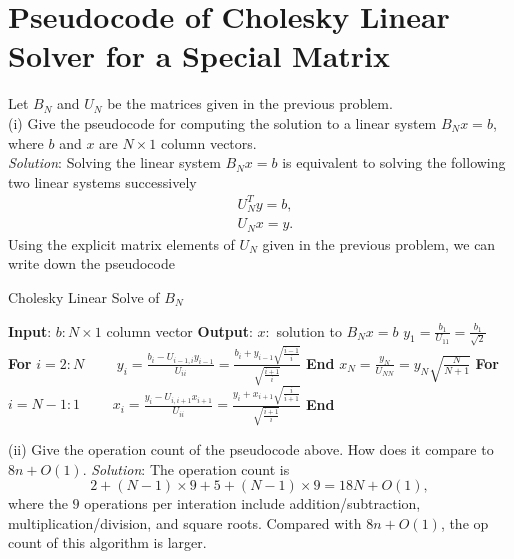 \documentclass[paper=a4, fontsize=11pt]{scrartcl} %
\numberwithin{equation}{section} %
\numberwithin{figure}{section} %
\numberwithin{table}{section} %
\begin{document}
\newpage

\section{Pseudocode of Cholesky Linear Solver for a Special Matrix}
Let $B_N$ and $U_N$ be the matrices given in the previous problem.\\
(i) Give the pseudocode for computing the solution to a linear system $B_N x =b$, where $b$ and $x$ are $N\times 1$ column vectors.\\
\textit{Solution}: Solving the linear system $B_N x =b$ is equivalent to solving the following two linear systems successively
\begin{align}
\nonumber & U_N^T y = b,\\
\nonumber & U_N x = y.
\end{align}
Using the explicit matrix elements of $U_N$ given in the previous problem, we can write down the pseudocode
\begin{algorithm}
\caption{Cholesky Linear Solve of $B_N$}\label{clsb}
\begin{algorithmic}
\STATE \textbf{Input}: $b: N\times 1$ column vector
\STATE \textbf{Output}: $x: $ solution to $B_N x =b$
\STATE $y_1 = \frac{b_1}{U_{11}}= \frac{b_1}{\sqrt{2}}$
\STATE \textbf{For} $i=2:N$
    \STATE $\quad\quad y_i = \frac{b_i - U_{i-1,i}y_{i-1}}{U_{ii}}= \frac{b_i + y_{i-1}\sqrt{\frac{i-1}{i}}}{\sqrt{\frac{i+1}{i}}}$
\STATE \textbf{End}
\STATE $x_N =\frac{y_N}{U_{NN}} = y_N\sqrt{\frac{N}{N+1}}$
\STATE \textbf{For} $i=N-1:1$
    \STATE $\quad\quad x_i = \frac{y_i - U_{i,i+1}x_{i+1}}{U_{ii}} = \frac{y_i + x_{i+1}\sqrt{\frac{i}{i+1}}}{\sqrt{\frac{i+1}{i}}}$
\STATE \textbf{End}
\end{algorithmic}
\end{algorithm}

(ii) Give the operation count of the pseudocode above. How does it compare to $8n+O(1)$.
\textit{Solution}: The operation count is
$$
2 + (N-1)\times 9 + 5 + (N-1)\times 9 = 18N + O(1),
$$
where the $9$ operations per interation include addition/subtraction, multiplication/division, and square roots. Compared with $8n+O(1)$, the op count of this algorithm is larger.

\newpage
\end{document}
